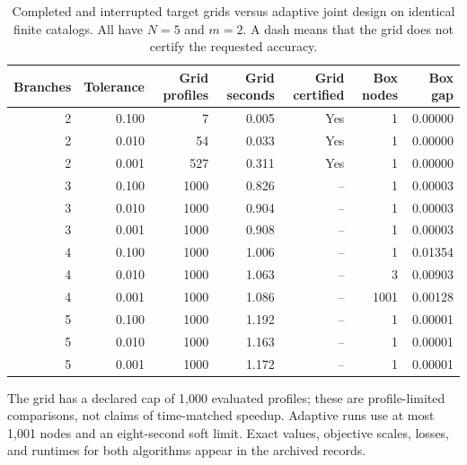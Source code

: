 \begin{table}[p]\centering
\caption{Completed and interrupted target grids versus adaptive joint design on identical finite catalogs. All have $N=5$ and $m=2$. A dash means that the grid does not certify the requested accuracy.}\label{tab:r46-grid}
\begin{tabular}{rrrrrrr}\toprule
Branches & Tolerance & Grid profiles & Grid seconds & Grid certified & Box nodes & Box gap \\\midrule
2 & 0.100 & 7 & 0.005 & Yes & 1 & 0.00000 \\
2 & 0.010 & 54 & 0.033 & Yes & 1 & 0.00000 \\
2 & 0.001 & 527 & 0.311 & Yes & 1 & 0.00000 \\
3 & 0.100 & 1000 & 0.826 & -- & 1 & 0.00003 \\
3 & 0.010 & 1000 & 0.904 & -- & 1 & 0.00003 \\
3 & 0.001 & 1000 & 0.908 & -- & 1 & 0.00003 \\
4 & 0.100 & 1000 & 1.006 & -- & 1 & 0.01354 \\
4 & 0.010 & 1000 & 1.063 & -- & 3 & 0.00903 \\
4 & 0.001 & 1000 & 1.086 & -- & 1001 & 0.00128 \\
5 & 0.100 & 1000 & 1.192 & -- & 1 & 0.00001 \\
5 & 0.010 & 1000 & 1.163 & -- & 1 & 0.00001 \\
5 & 0.001 & 1000 & 1.172 & -- & 1 & 0.00001 \\
\bottomrule\end{tabular}\par\smallskip\raggedright The grid has a declared cap of 1,000 evaluated profiles; these are profile-limited comparisons, not claims of time-matched speedup. Adaptive runs use at most 1,001 nodes and an eight-second soft limit. Exact values, objective scales, losses, and runtimes for both algorithms appear in the archived records.\end{table}
